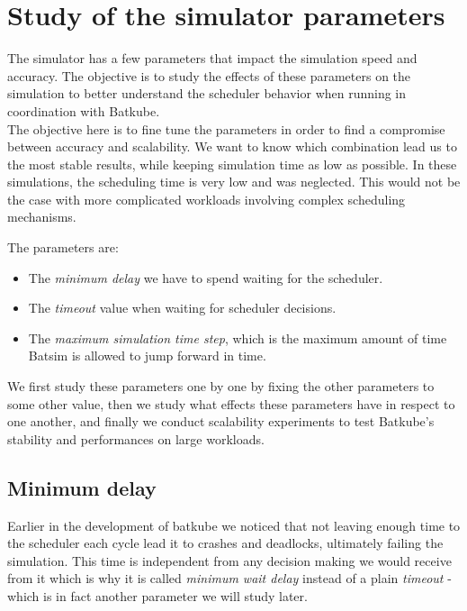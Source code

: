 \section{Study of the simulator parameters} \label{sec:params-eval}

The simulator has a few parameters that impact the simulation speed and
accuracy. The objective is to study the effects of these parameters on the
simulation to better understand the scheduler behavior when running in
coordination with Batkube.\\

The objective here is to fine tune the parameters in order to find a compromise
between accuracy and scalability. We want to know which combination lead us to
the most stable results, while keeping simulation time as low as possible. In
these simulations, the scheduling time is very low and was neglected.  This
would not be the case with more complicated workloads involving complex
scheduling mechanisms.

The parameters are:
\begin{itemize}
	\item The \textit{minimum delay} we have to spend waiting for the
		scheduler.
	\item The \textit{timeout} value when waiting for scheduler decisions.
	\item The \textit{maximum simulation time step}, which is the maximum
		amount of time Batsim is allowed to jump forward in time.
\end{itemize}

We first study these parameters one by one by fixing the other parameters to
some other value, then we study what effects these parameters have in respect
to one another, and finally we conduct scalability experiments to test
Batkube's stability and performances on large workloads.

\subsection{Minimum delay}

Earlier in the development of batkube we noticed that not leaving enough time
to the scheduler each cycle lead it to crashes and deadlocks, ultimately
failing the simulation. This time is independent from any decision making we
would receive from it which is why it is called \textit{minimum wait delay}
instead of a plain \textit{timeout} - which is in fact another parameter we
will study later.

